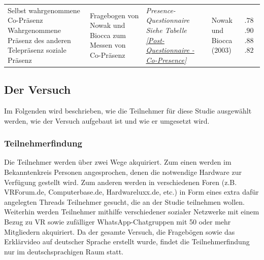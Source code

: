 \documentclass[a4paper,11pt]{article}%
\renewcommand{\\}{\vspace*{0.5\baselineskip} \newline}
\begin{document}
{\begin{table}
\begin{tabular}{| p{3.5cm} | p{3.5cm} | p{3.0cm} | p{2.0cm} |  p{1.7cm} |}
    \hline
\multirow{2}{3.5cm}{Selbst wahrgenommene Co-Präsenz \newline \newline Wahrgenommene Präsenz des anderen \newline \newline Telepräsenz \newline \newline soziale Präsenz}
	&Fragebogen von Nowak und Biocca zum Messen von Co-Präsenz \newline  \newline  \newline  \newline  \newline  \newline & \textit{Presence-Questionnaire} \newline \textit{Siehe Tabelle \ref{Post-Questionnaire - Co-Presence}} & Nowak und Biocca (2003) \citep[S. 487]{nowak2003effect} & $.78$ \newline \newline \newline $.90$ \newline \newline \newline $.88$ \newline \newline $.82$ \\
\hline
	\end{tabular}
\end{table}
\clearpage			

\subsection{Der Versuch}
Im Folgenden wird beschrieben, wie die Teilnehmer für diese Studie ausgewählt werden, wie der Versuch aufgebaut ist und wie er umgesetzt wird.
	\subsubsection{Teilnehmerfindung}
Die Teilnehmer werden über zwei Wege akquiriert. Zum einen werden im Bekanntenkreis Personen angesprochen, denen die notwendige Hardware zur Verfügung gestellt wird. Zum anderen werden in verschiedenen Foren (z.B. VRForum.de, Computerbase.de, Hardwareluxx.de, etc.) in Form eines extra dafür angelegten Threads Teilnehmer gesucht, die an der Studie teilnehmen wollen. Weiterhin werden Teilnehmer mithilfe verschiedener sozialer Netzwerke mit einem Bezug zu VR sowie zufälliger WhatsApp-Chatgruppen mit 50 oder mehr Mitgliedern akquiriert. Da der gesamte Versuch, die Fragebögen sowie das Erklärvideo auf deutscher Sprache erstellt wurde, findet die Teilnehmerfindung nur im deutschsprachigen Raum statt.

}
\end{document}
